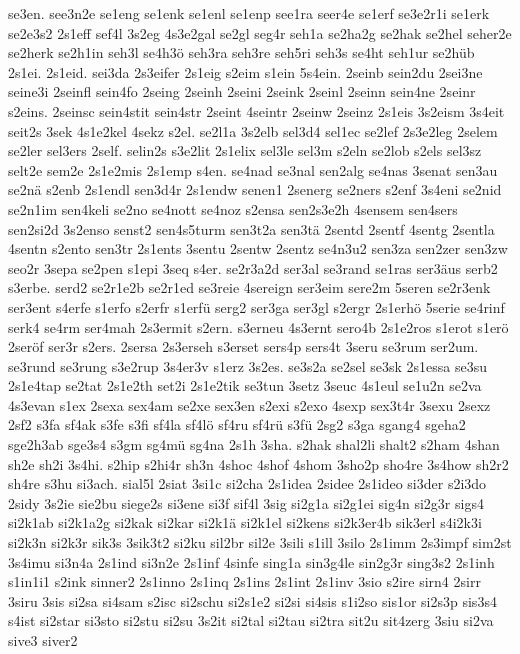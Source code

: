 {se3en.
see3n2e
se1eng
se1enk
se1enl
se1enp
see1ra
seer4e
se1erf
se3e2r1i
se1erk
se2e3s2
2s1eff
sef4l
3s2eg
4s3e2gal
se2gl
seg4r
seh1a
se2ha2g
se2hak
se2hel
seher2e
se2herk
se2h1in
seh3l
se4h3ö
seh3ra
seh3re
seh5ri
seh3s
se4ht
seh1ur
se2hüb
2s1ei.
2s1eid.
sei3da
2s3eifer
2s1eig
s2eim
s1ein
5s4ein.
2seinb
sein2du
2sei3ne
seine3i
2seinfl
sein4fo
2seing
2seinh
2seini
2seink
2seinl
2seinn
sein4ne
2seinr
s2eins.
2seinsc
sein4stit
sein4str
2seint
4seintr
2seinw
2seinz
2s1eis
3s2eism
3s4eit
seit2s
3sek
4s1e2kel
4sekz
s2el.
se2l1a
3s2elb
sel3d4
sel1ec
se2lef
2s3e2leg
2selem
se2ler
sel3ers
2self.
selin2s
s3e2lit
2s1elix
sel3le
sel3m
s2eln
se2lob
s2els
sel3sz
selt2e
sem2e
2s1e2mis
2s1emp
s4en.
se4nad
se3nal
sen2alg
se4nas
3senat
sen3au
se2nä
s2enb
2s1endl
sen3d4r
2s1endw
senen1
2senerg
se2ners
s2enf
3s4eni
se2nid
se2n1im
sen4keli
se2no
se4nott
se4noz
s2ensa
sen2s3e2h
4sensem
sen4sers
sen2si2d
3s2enso
senst2
sen4s5turm
sen3t2a
sen3tä
2sentd
2sentf
4sentg
2sentla
4sentn
s2ento
sen3tr
2s1ents
3sentu
2sentw
2sentz
se4n3u2
sen3za
sen2zer
sen3zw
seo2r
3sepa
se2pen
s1epi
3seq
s4er.
se2r3a2d
ser3al
se3rand
se1ras
ser3äus
serb2
s3erbe.
serd2
se2r1e2b
se2r1ed
se3reie
4sereign
ser3eim
sere2m
5seren
se2r3enk
ser3ent
s4erfe
s1erfo
s2erfr
s1erfü
serg2
ser3ga
ser3gl
s2ergr
2s1erhö
5serie
se4rinf
serk4
se4rm
ser4mah
2s3ermit
s2ern.
s3erneu
4s3ernt
sero4b
2s1e2ros
s1erot
s1erö
2seröf
ser3r
s2ers.
2sersa
2s3erseh
s3erset
sers4p
sers4t
3seru
se3rum
ser2um.
se3rund
se3rung
s3e2rup
3s4er3v
s1erz
3s2es.
se3s2a
se2sel
se3sk
2s1essa
se3su
2s1e4tap
se2tat
2s1e2th
set2i
2s1e2tik
se3tun
3setz
3seuc
4s1eul
se1u2n
se2va
4s3evan
s1ex
2sexa
sex4am
se2xe
sex3en
s2exi
s2exo
4sexp
sex3t4r
3sexu
2sexz
2sf2
s3fa
sf4ak
s3fe
s3fi
sf4la
sf4lö
sf4ru
sf4rü
s3fü
2sg2
s3ga
sgang4
sgeha2
sge2h3ab
sge3s4
s3gm
sg4mü
sg4na
2s1h
3sha.
s2hak
shal2li
shalt2
s2ham
4shan
sh2e
sh2i
3s4hi.
s2hip
s2hi4r
sh3n
4shoc
4shof
4shom
3sho2p
sho4re
3s4how
sh2r2
sh4re
s3hu
si3ach.
sial5l
2siat
3si1c
si2cha
2s1idea
2sidee
2s1ideo
si3der
s2i3do
2sidy
3s2ie
sie2bu
siege2s
si3ene
si3f
sif4l
3sig
si2g1a
si2g1ei
sig4n
si2g3r
sigs4
si2k1ab
si2k1a2g
si2kak
si2kar
si2k1ä
si2k1el
si2kens
si2k3er4b
sik3erl
s4i2k3i
si2k3n
si2k3r
sik3s
3sik3t2
si2ku
sil2br
sil2e
3sili
s1ill
3silo
2s1imm
2s3impf
sim2st
3s4imu
si3n4a
2s1ind
si3n2e
2s1inf
4sinfe
sing1a
sin3g4le
sin2g3r
sing3s2
2s1inh
s1in1i1
s2ink
sinner2
2s1inno
2s1inq
2s1ins
2s1int
2s1inv
3sio
s2ire
sirn4
2sirr
3siru
3sis
si2sa
si4sam
s2isc
si2schu
si2s1e2
si2si
si4sis
s1i2so
sis1or
si2s3p
sis3s4
s4ist
si2star
si3sto
si2stu
si2su
3s2it
si2tal
si2tau
si2tra
sit2u
sit4zerg
3siu
si2va
sive3
siver2
}
